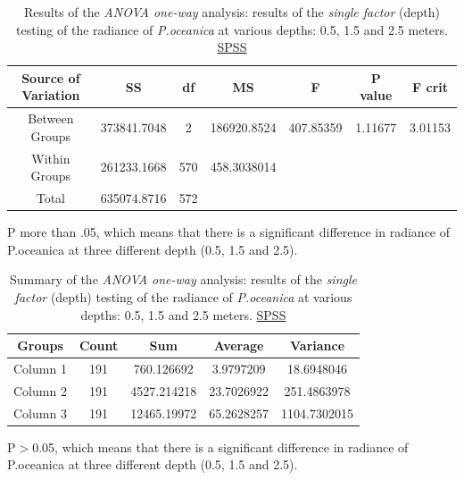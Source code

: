 \documentclass[10pt, a4paper]{article}
\begin{document}
\begin{appendices}
\begin{table}[htbp]
	\caption{Results of the \textit{ANOVA one-way} analysis: results of the \textit{single factor} (depth) testing of the radiance of \textit{P.oceanica} at various depths: 		0.5, 1.5 and 2.5 meters. \href{http://www.spss.com/}{SPSS}}
	\begin{center}
	\begin{tabular}{|c|c|c|c|c|c|c|}
		\hline\hline
		\textbf{Source of Variation} & \textbf{SS} & \textbf{df} & \textbf{MS} & \textbf{F} & \textbf{P value} & \textbf{F crit} \\ \hline
		Between Groups & 373841.7048 & 2 & 186920.8524 & 407.85359 & 1.11677 & 3.01153 \\ \hline
		Within Groups & 261233.1668 & 570 & 458.3038014 & & & \\ \hline
		Total &  635074.8716 & 572 & & & & \\ \hline
	\end{tabular}
	\end{center} 
	P more than .05, which means that there is a significant difference in radiance of P.oceanica at three different depth (0.5, 1.5 and 2.5). 
	\label{tab:8}
\end{table}

\begin{table}[htbp]
	\caption{Summary of the \textit{ANOVA one-way} analysis: results of the \textit{single factor} (depth) testing of the radiance of \textit{P.oceanica} at various depths: 		0.5, 1.5 and 2.5 meters. \href{http://www.spss.com/}{SPSS}}
	\begin{center}
	\begin{tabular}{|c|c|c|c|c|}
		\hline\hline
		\textbf{Groups} & \textbf{Count} & \textbf{Sum} & \textbf{Average} & \textbf{Variance} \\ \hline\hline
		Column 1 & 191 &	760.126692 & 3.9797209 & 18.6948046 \\ \hline
		Column 2 & 191 &	4527.214218 & 23.7026922  & 251.4863978 \\ \hline
		Column 3 & 191 &	12465.19972 & 65.2628257 & 1104.7302015 \\ \hline
	\end{tabular}
	\end{center}
	P$>$0.05, which means that there is a significant difference in radiance of P.oceanica at three different depth (0.5, 1.5 and 2.5). 
 	\label{tab:9}
\end{table}
\pagebreak


\end{appendices}
\end{document}
